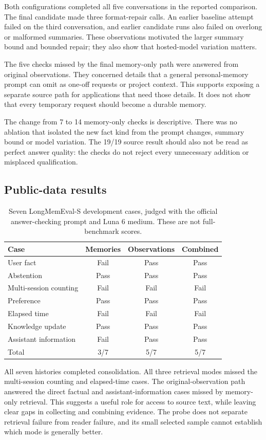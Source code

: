 \documentclass[11pt]{article}
\begin{document}
Both configurations completed all five conversations in the reported comparison. The final candidate made three format-repair calls. An earlier baseline attempt failed on the third conversation, and earlier candidate runs also failed on overlong or malformed summaries. These observations motivated the larger summary bound and bounded repair; they also show that hosted-model variation matters.

The five checks missed by the final memory-only path were answered from original observations. They concerned details that a general personal-memory prompt can omit as one-off requests or project context. This supports exposing a separate source path for applications that need those details. It does not show that every temporary request should become a durable memory.

The change from 7 to 14 memory-only checks is descriptive. There was no ablation that isolated the new fact kind from the prompt changes, summary bound or model variation. The 19/19 source result should also not be read as perfect answer quality: the checks do not reject every unnecessary addition or misplaced qualification.

\subsection{Public-data results}
\begin{table}[h]
\centering
\begin{tabular}{lccc}
\toprule
Case & Memories & Observations & Combined\\
\midrule
User fact & Fail & Pass & Pass\\
Abstention & Pass & Pass & Pass\\
Multi-session counting & Fail & Fail & Fail\\
Preference & Pass & Pass & Pass\\
Elapsed time & Fail & Fail & Fail\\
Knowledge update & Pass & Pass & Pass\\
Assistant information & Fail & Pass & Pass\\
\midrule
Total & 3/7 & 5/7 & 5/7\\
\bottomrule
\end{tabular}
\caption{Seven LongMemEval-S development cases, judged with the official answer-checking prompt and Luna 6 medium. These are not full-benchmark scores.}
\end{table}

All seven histories completed consolidation. All three retrieval modes missed the multi-session counting and elapsed-time cases. The original-observation path answered the direct factual and assistant-information cases missed by memory-only retrieval. This suggests a useful role for access to source text, while leaving clear gaps in collecting and combining evidence. The probe does not separate retrieval failure from reader failure, and its small selected sample cannot establish which mode is generally better.
\end{document}
